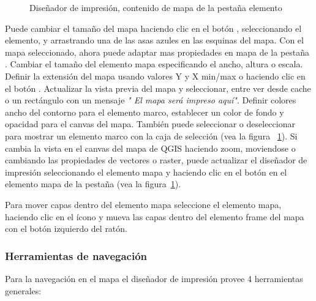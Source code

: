 \begin{figure}[ht]
\centering
\caption{Diseñador de impresión, contenido de mapa de la pestaña elemento \nixcaption}\label{fig:print_composer_map_item}
   \goodgap
\end{figure}

Puede cambiar el tamaño del mapa haciendo clic en el botón , seleccionando el elemento, y arrastrando una de las asas azules en las esquinas del mapa. Con el mapa seleccionado, ahora puede adaptar mas propiedades en mapa de la pestaña . Cambiar el tamaño del elemento mapa especificando el ancho, altura o escala. Definir la extensión del mapa usando valores Y y 
X min/max o haciendo clic en el botón . Actualizar la 
vista previa del mapa y seleccionar, entre ver desde cache o un rectángulo  con un mensaje 
\textit{" El mapa será impreso aquí"}. Definir colores ancho del contorno para el elemento 
marco, establecer un color de fondo y opacidad para el canvas del mapa. También puede seleccionar 
o deseleccionar para mostrar un elemento marco con la caja de selección   
(vea la figura ~\ref{fig:print_composer_map_item}). Si cambia la vista en el canvas del mapa de QGIS 
haciendo zoom, moviendose o cambiando las propiedades de vectores o raster, puede actualizar  
el diseñador de impresión seleccionando el elemento mapa y haciendo clic 
en el botón  en el elemento mapa de la pestaña  
(vea la figura~\ref{fig:print_composer_map_item}). 

Para mover capas dentro del elemento mapa seleccione el elemento mapa, haciendo clic 
en el ícono  
y mueva las capas dentro del elemento frame del mapa con el botón izquierdo del ratón.

\subsubsection{Herramientas de navegación}

Para la navegación en el mapa el diseñador de impresión provee 4 herramientas generales:

